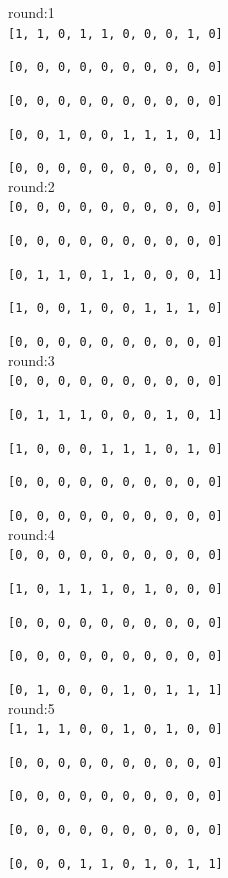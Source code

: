 \documentclass[12pt]{article}
\begin{document}
round:1\\

{\tt [1, 1, 0, 1, 1, 0, 0, 0, 1, 0]}

{\tt [0, 0, 0, 0, 0, 0, 0, 0, 0, 0]}

{\tt [0, 0, 0, 0, 0, 0, 0, 0, 0, 0]}

{\tt [0, 0, 1, 0, 0, 1, 1, 1, 0, 1]}

{\tt [0, 0, 0, 0, 0, 0, 0, 0, 0, 0]}\\

round:2\\

{\tt [0, 0, 0, 0, 0, 0, 0, 0, 0, 0]}

{\tt [0, 0, 0, 0, 0, 0, 0, 0, 0, 0]}

{\tt [0, 1, 1, 0, 1, 1, 0, 0, 0, 1]}

{\tt [1, 0, 0, 1, 0, 0, 1, 1, 1, 0]}

{\tt [0, 0, 0, 0, 0, 0, 0, 0, 0, 0]}\\

round:3\\

{\tt [0, 0, 0, 0, 0, 0, 0, 0, 0, 0]}

{\tt [0, 1, 1, 1, 0, 0, 0, 1, 0, 1]}

{\tt [1, 0, 0, 0, 1, 1, 1, 0, 1, 0]}

{\tt [0, 0, 0, 0, 0, 0, 0, 0, 0, 0]}

{\tt [0, 0, 0, 0, 0, 0, 0, 0, 0, 0]}\\

round:4\\

{\tt [0, 0, 0, 0, 0, 0, 0, 0, 0, 0]}

{\tt [1, 0, 1, 1, 1, 0, 1, 0, 0, 0]}

{\tt [0, 0, 0, 0, 0, 0, 0, 0, 0, 0]}

{\tt [0, 0, 0, 0, 0, 0, 0, 0, 0, 0]}

{\tt [0, 1, 0, 0, 0, 1, 0, 1, 1, 1]}\\

round:5\\

{\tt [1, 1, 1, 0, 0, 1, 0, 1, 0, 0]}

{\tt [0, 0, 0, 0, 0, 0, 0, 0, 0, 0]}

{\tt [0, 0, 0, 0, 0, 0, 0, 0, 0, 0]}

{\tt [0, 0, 0, 0, 0, 0, 0, 0, 0, 0]}

{\tt [0, 0, 0, 1, 1, 0, 1, 0, 1, 1]}\\
\end{document}
